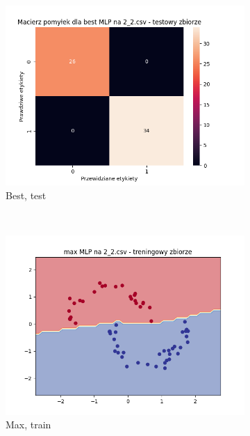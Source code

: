 \documentclass[12pt]{article}
\newcommand*{\subfigwidth}{0.24\textwidth}
\begin{document}
\begin{figure}[H]
\begin{subfigure}[t]{\subfigwidth}
        \includegraphics[width=\linewidth]{img/exp_3/mlp/2_2/best/test_matrix.png}
        \caption{Best, test}
    \end{subfigure}
    \\
    \begin{subfigure}[t]{\subfigwidth}
        \includegraphics[width=\linewidth]{img/exp_3/mlp/2_2/max/train_boundary.png}
        \caption{Max, train}
    \end{subfigure}
    \hfill
    \begin{subfigure}[t]{\subfigwidth}

\end{subfigure}
\end{figure}
\end{document}
